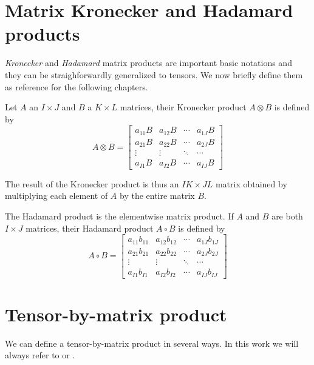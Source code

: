 \section{Matrix Kronecker and Hadamard products}
\emph{Kronecker} and \emph{Hadamard} matrix products are important basic notations and they can be straighforwardly generalized to tensors. We now briefly define them as reference for the following chapters.
\begin{Def}
  Let $A$ an $I \times J$ and $B$ a $K \times L$ matrices, their Kronecker product $A \otimes B$ is defined by
  \begin{equation} \label{def:kronecker}
    A \otimes B =
    \begin{bmatrix}
      a_{11}B & a_{12}B & \cdots & a_{1J}B \\
      a_{21}B & a_{22}B & \cdots & a_{2J}B \\
      \vdots & \vdots & \ddots & \cdots \\
      a_{I1}B & a_{I2}B & \cdots & a_{IJ}B
    \end{bmatrix}
  \end{equation}
\end{Def}
The result of the Kronecker product is thus an $IK \times JL$ matrix obtained by multiplying each element of $A$ by the entire matrix $B$.

\begin{Def}
  The Hadamard product is the elementwise matrix product. If $A$ and $B$ are both $I \times J$ matrices, their Hadamard product $A \circ B$ is defined by
  \begin{equation} \label{def:hadamard}
    A \circ B =
    \begin{bmatrix}
      a_{11}b_{11} & a_{12}b_{12} & \cdots & a_{1J}b_{1J} \\
      a_{21}b_{21} & a_{22}b_{22} & \cdots & a_{2J}b_{2J} \\
      \vdots & \vdots & \ddots & \cdots \\
      a_{I1}b_{I1} & a_{I2}b_{I2} & \cdots & a_{IJ}b_{IJ}
    \end{bmatrix}
  \end{equation}
\end{Def}

\section{Tensor-by-matrix product}
We can define a tensor-by-matrix product in several ways. In this work we will always refer to  or .

